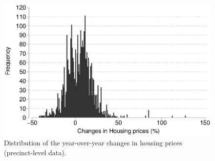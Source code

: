 \documentclass[12pt,a4paper]{article}
\begin{document}
	\begin{figure}
		\includegraphics[width=1\textwidth]{../figures/desplot.eps}
		\caption{Distribution of the year-over-year changes in housing prices (precinct-level data). }
		\label{desplot}
	\end{figure}
	
	
	\clearpage
	
	
	
	
	
\end{document}
